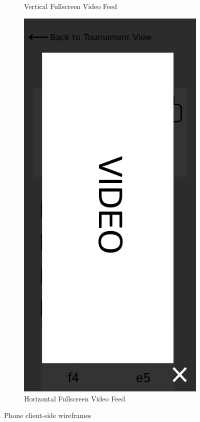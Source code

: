 \begin{figure}[h!]
\begin{subfigure}[h!]{0.2\linewidth}
        \caption{Vertical Fullscreen Video Feed}
        \label{fig:phone-fullscreen-video-vertical}
    \end{subfigure}
    \hfill
    \begin{subfigure}[h!]{0.2\linewidth}
        \centering
        \includegraphics[width=\linewidth]{figures/methods/wireframes/phone-full-screen-video-view-horizontal.png}
        \caption{Horizontal Fullscreen Video Feed}
        \label{fig:phone-fullscreen-video-horizontal}
    \end{subfigure}
    
    \caption{Phone client-side wireframes}
    \label{fig:phone-view-group}
\end{figure}

